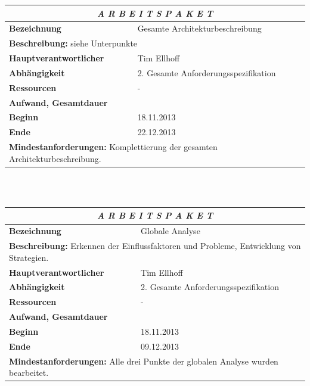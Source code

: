 \documentclass[fontsize=12pt,paper=a4,twoside]{scrartcl}
\begin{document}
\begin{tabular}{p{7.5cm}|p{7.5cm}}\toprule
\multicolumn{2}{c}{\textbf{\textit{A R B E I T S P A K E T \quad 3}}} \\ \toprule \hline
\textbf{Bezeichnung} & Gesamte Architekturbeschreibung\\\hline
\multicolumn{2}{p{15cm}}{\textbf{Beschreibung:} \newline 
siehe Unterpunkte}  \\\hline
\textbf{Hauptverantwortlicher} & Tim Ellhoff \\\hline
\textbf{Abhängigkeit} & 2. Gesamte Anforderungsspezifikation\\\hline
\textbf{Ressourcen} & -
\\\hline
\textbf{Aufwand, Gesamtdauer} & \\\hline
\textbf{Beginn} & 18.11.2013 \\\hline
\textbf{Ende} & 22.12.2013\\\hline
\multicolumn{2}{p{15cm}}{\textbf{Mindestanforderungen: } \newline
Komplettierung der gesamten Architekturbeschreibung. }  \\ \toprule
\end{tabular} \\\\

\begin{tabular}{p{7.5cm}|p{7.5cm}}\toprule
\multicolumn{2}{c}{\textbf{\textit{A R B E I T S P A K E T \quad 3.1}}} \\ \toprule \hline
\textbf{Bezeichnung} & Globale Analyse\\\hline
\multicolumn{2}{p{15cm}}{\textbf{Beschreibung:} \newline 
Erkennen der Einflussfaktoren und Probleme, Entwicklung von Strategien.}  \\\hline
\textbf{Hauptverantwortlicher} & Tim Ellhoff \\\hline
\textbf{Abhängigkeit} & 2. Gesamte Anforderungsspezifikation\\\hline
\textbf{Ressourcen} & -
\\\hline
\textbf{Aufwand, Gesamtdauer} & \\\hline
\textbf{Beginn} & 18.11.2013 \\\hline
\textbf{Ende} & 09.12.2013\\\hline
\multicolumn{2}{p{15cm}}{\textbf{Mindestanforderungen: } \newline
Alle drei Punkte der globalen Analyse wurden bearbeitet. }  \\ \toprule
\end{tabular} \\\\
\end{document}
